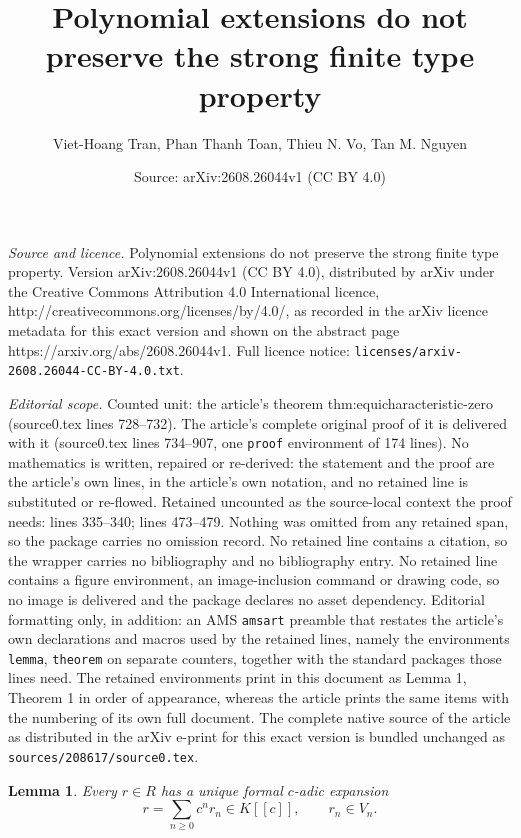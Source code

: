 \documentclass[10pt,a4paper]{amsart}
\title{Polynomial extensions do not preserve the strong finite type property}
\author{Viet-Hoang Tran, Phan Thanh Toan, Thieu N. Vo, Tan M. Nguyen}
\date{Source: arXiv:2608.26044v1 (CC BY 4.0)}
\newtheorem{lemma}{Lemma}
\begin{document}
\maketitle

\noindent\emph{Source and licence.} Polynomial extensions do not preserve the strong finite type property. Version arXiv:2608.26044v1 (CC BY 4.0), distributed by arXiv under the Creative Commons Attribution 4.0 International licence, http://creativecommons.org/licenses/by/4.0/, as recorded in the arXiv licence metadata for this exact version and shown on the abstract page https://arxiv.org/abs/2608.26044v1. Full licence notice: \texttt{licenses/arxiv-2608.26044-CC-BY-4.0.txt}.\par\smallskip

\noindent\textit{Editorial scope.} Counted unit: the article's theorem thm:equicharacteristic-zero (source0.tex lines 728--732). The article's complete original proof of it is delivered with it (source0.tex lines 734--907, one \texttt{proof} environment of 174 lines). No mathematics is written, repaired or re-derived: the statement and the proof are the article's own lines, in the article's own notation, and no retained line is substituted or re-flowed.  Retained uncounted as the source-local context the proof needs: lines 335--340; lines 473--479.  Nothing was omitted from any retained span, so the package carries no omission record.  No retained line contains a citation, so the wrapper carries no bibliography and no bibliography entry.  No retained line contains a figure environment, an image-inclusion command or drawing code, so no image is delivered and the package declares no asset dependency.  Editorial formatting only, in addition: an AMS \texttt{amsart} preamble that restates the article's own declarations and macros used by the retained lines, namely the environments \texttt{lemma}, \texttt{theorem} on separate counters, together with the standard packages those lines need.  The retained environments print in this document as Lemma 1, Theorem 1 in order of appearance, whereas the article prints the same items with the numbering of its own full document.  The complete native source of the article as distributed in the arXiv e-print for this exact version is bundled unchanged as \texttt{sources/208617/source0.tex}.
\begin{lemma}\label{lem:formal-expansion}
Every $r\in R$ has a unique formal $c$-adic expansion
\begin{equation}\label{eq:formal-expansion}
  r=\sum_{n\geq0}c^nr_n\in K[[c]],\qquad r_n\in V_n.
\end{equation}
\end{lemma}
\end{document}
